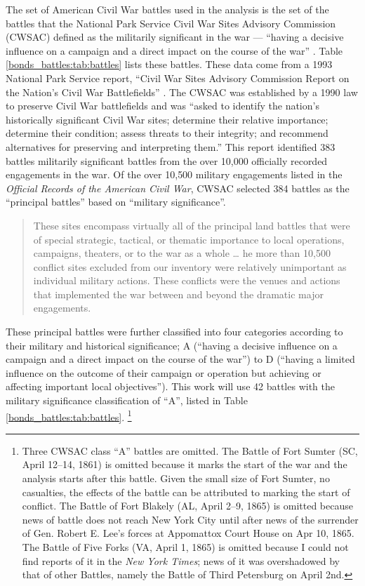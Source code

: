 The set of American Civil War battles used in the analysis is the set of the battles that the National Park Service Civil War Sites Advisory Commission (CWSAC) defined as the militarily significant in the war --- ``having a decisive influence on a campaign and a direct impact on the course of the war'' \parencite{CWSAC1993}.
Table \ref{bonds_battles:tab:battles} lists these battles.
These data come from a 1993 National Park Service report, ``Civil War Sites Advisory Commission Report on the Nation's Civil War Battlefields'' \parencites{CWSAC1993}{CWSAC1993b}.
The CWSAC was established by a 1990 law to preserve Civil War battlefields and was ``asked to identify the nation's historically significant Civil War sites; determine their relative importance; determine their condition; assess threats to their integrity; and recommend alternatives for preserving and interpreting them.'' \parencite{CWSAC1993b}
This report identified 383 battles militarily significant battles from the over 10,000 officially recorded engagements in the war.
Of the over 10,500 military engagements listed in the \textit{Official Records of the American Civil War}, CWSAC selected 384 battles as the ``principal battles'' based on ``military significance''.
\begin{quote}
  These sites encompass virtually all of the principal land battles that were of special strategic, tactical, or thematic importance to local operations, campaigns, theaters, or to the war as a whole \dots{} he more than 10,500 conflict sites excluded from our inventory were relatively unimportant as individual military actions. These conflicts were the venues and actions that implemented the war between and beyond the dramatic major engagements. \parencite{CWSAC1993}
\end{quote}
These principal battles were further classified into four categories according to their military and historical significance; A (``having a decisive influence on a campaign and a direct impact on the course of the war'') to D (``having a limited influence on the outcome of their campaign or operation but achieving or affecting important local objectives'').
This work will use 42 battles with the military significance classification of ``A'', listed in Table \ref{bonds_battles:tab:battles}.%
\footnote{
  Three CWSAC class ``A'' battles are omitted.
  The Battle of Fort Sumter (SC, April 12--14, 1861) is omitted because it marks the start of the war and the analysis starts after this battle.
  Given the small size of Fort Sumter, no casualties, the effects of the battle can be attributed to marking the start of conflict.
  The Battle of Fort Blakely (AL, April 2--9, 1865) is omitted because news of battle does not reach New York City until after news of the surrender of Gen. Robert E. Lee's forces at Appomattox Court House on Apr 10, 1865.
  The Battle of Five Forks (VA, April 1, 1865) is omitted because I could not find reports of it in the \textit{New York Times}; news of it was overshadowed by that of other Battles, namely the Battle of Third Petersburg on April 2nd.
}
